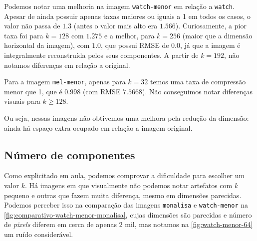 \documentclass[brazilian,a4paper,twocolumn]{article}
\begin{document}
        Podemos notar uma melhoria na imagem \texttt{watch-menor} em relação a \texttt{watch}. Apesar de ainda possuir apenas taxas maiores ou iguais a 1 em todos os casos, o valor não passa de $1.3$ (antes o valor mais alto era $1.566$). Curiosamente, a pior taxa foi para $k=128$ com $1.275$ e a melhor, para $k=256$ (maior que a dimensão horizontal da imagem), com $1.0$, que possui RMSE de $0.0$, já que a imagem é integralmente reconstruída pelos seus componentes. A partir de $k=192$, não notamos diferenças em relação a original.

        Para a imagem \texttt{mel-menor}, apenas para $k=32$ temos uma taxa de compressão menor que 1, que é $0.998$ (com RMSE $7.5668$). Não conseguimos notar diferenças visuais para $k \geq 128$.

        Ou seja, nessas imagens não obtivemos uma melhora pela redução da dimensão: ainda há espaço extra ocupado em relação a imagem original.

    \subsection{Número de componentes}

        Como explicitado em aula, podemos comprovar a dificuldade para escolher um valor $k$. Há imagens em que visualmente não podemos notar artefatos com $k$ pequeno e outras que fazem muita diferença, mesmo em dimensões parecidas. Podemos perceber isso na comparação das imagens \texttt{monalisa} e \texttt{watch-menor} na \cref{fig:comparativo-watch-menor-monalisa}, cujas dimensões são parecidas e número de \textit{pixels} diferem em cerca de apenas 2 mil, mas notamos na \cref{fig:watch-menor-64} um ruído considerável.
\end{document}

